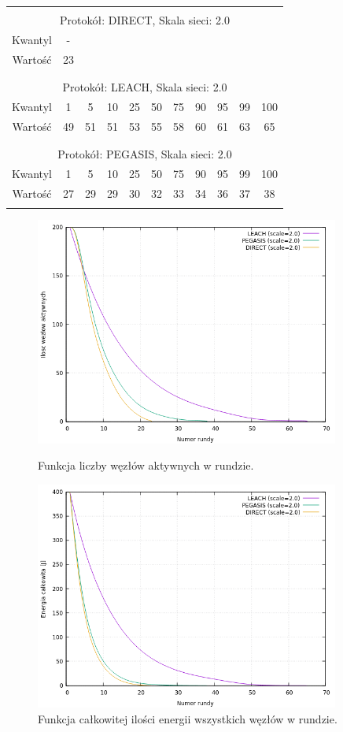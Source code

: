 \documentclass[a4paper,12pt,twoside,openany]{report}
\begin{document}
\begin{longtable}{*{11}{c}}
\toprule \\*
\multicolumn{11}{c}{Protokół: DIRECT, Skala sieci: 2.0} \\*
Kwantyl	& -	\\*
Wartość	& 23	\\*
\midrule \\*
\\*
\multicolumn{11}{c}{Protokół: LEACH, Skala sieci: 2.0} \\*
Kwantyl	& 1	& 5	& 10	& 25	& 50	& 75	& 90	& 95	& 99	& 100	\\*
Wartość	& 49	& 51	& 51	& 53	& 55	& 58	& 60	& 61	& 63	& 65	\\*
\midrule \\*
\\*
\multicolumn{11}{c}{Protokół: PEGASIS, Skala sieci: 2.0} \\*
Kwantyl	& 1	& 5	& 10	& 25	& 50	& 75	& 90	& 95	& 99	& 100	\\*
Wartość	& 27	& 29	& 29	& 30	& 32	& 33	& 34	& 36	& 37	& 38	\\*	
\bottomrule \\*
\end{longtable}

\begin{figure}[H]
 \centering
 \includegraphics[width=10cm]{images/gnuplot/test_3/nodes_in_round_xy400.png}
 \caption{Funkcja liczby węzłów aktywnych w rundzie.}
 \includegraphics[width=10cm]{images/gnuplot/test_3/energy_in_round_xy400.png}
 \caption{Funkcja całkowitej ilości energii wszystkich węzłów w rundzie.}
\end{figure}
\end{document}
